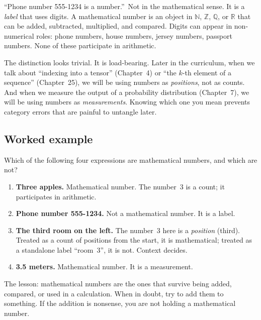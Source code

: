 \begin{mistake}
``Phone number 555-1234 is a number.''\ Not in the mathematical sense. It is a \emph{label} that uses digits. A mathematical number is an object in $\mathbb{N}$, $\mathbb{Z}$, $\mathbb{Q}$, or $\mathbb{R}$ that can be added, subtracted, multiplied, and compared. Digits can appear in non-numerical roles: phone numbers, house numbers, jersey numbers, passport numbers. None of these participate in arithmetic.
\end{mistake}

The distinction looks trivial. It is load-bearing. Later in the curriculum, when we talk about ``indexing into a tensor'' (Chapter~4) or ``the \(k\)-th element of a sequence'' (Chapter~25), we will be using numbers as \emph{positions}, not as counts. And when we measure the output of a probability distribution (Chapter~7), we will be using numbers as \emph{measurements}. Knowing which one you mean prevents category errors that are painful to untangle later.

\subsection*{Worked example}

Which of the following four expressions are mathematical numbers, and which are not?

\begin{enumerate}
  \item \textbf{Three apples.} Mathematical number. The number~$3$ is a count; it participates in arithmetic.
  \item \textbf{Phone number 555-1234.} Not a mathematical number. It is a label.
  \item \textbf{The third room on the left.} The number~$3$ here is a \emph{position} (third). Treated as a count of positions from the start, it is mathematical; treated as a standalone label ``room~3'', it is not. Context decides.
  \item \textbf{3.5 meters.} Mathematical number. It is a measurement.
\end{enumerate}

The lesson: mathematical numbers are the ones that survive being added, compared, or used in a calculation. When in doubt, try to add them to something. If the addition is nonsense, you are not holding a mathematical number.


